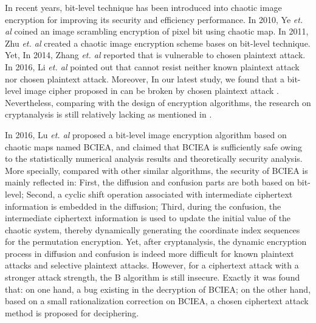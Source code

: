 \documentclass[final,3p,times,twocolumn]{elsarticle}
\begin{document}
In recent years, bit-level technique has been introduced into chaotic image encryption for improving its security and efficiency performance. In 2010, Ye \textit{et. al} \cite{YE2010PRL} coined an image scrambling encryption of pixel bit using chaotic map. In 2011, Zhu \textit{et. al} \cite{zhuzl2011infsci} created a chaotic image encryption scheme bases on bit-level technique. Yet, In 2014, Zhang \textit{et. al} reported that \cite{zhuzl2011infsci} is vulnerable to chosen plaintext attack. In 2016, Li \textit{et. al} pointed out that \cite{YE2010PRL} cannot resist neither known plaintext attack nor chosen plaintext attack. Moreover, In our latest study, we found that a bit-level image cipher proposed in \cite{Shafique2018epjp} can be broken by chosen plaintext attack \cite{wenh2019epjp}. Nevertheless, comparing with the design of encryption algorithms, the research on cryptanalysis is still relatively lacking as mentioned in \cite{wenhp2019entropy}. 


In 2016, Lu \textit{et. al} \cite{LuX2016OLE} proposed a bit-level image encryption algorithm based on chaotic maps named BCIEA, and claimed that BCIEA is sufficiently safe owing to the statistically numerical analysis results and theoretically security analysis. 
More specially, compared with other similar algorithms, the security of BCIEA is mainly reflected in: First, the diffusion and confusion parts are both based on bit-level; Second, a cyclic shift operation associated with intermediate ciphertext information is embedded in the diffusion; Third, during the confusion, the intermediate ciphertext information is used to update the initial value of the chaotic system, thereby dynamically generating the coordinate index sequences for the permutation encryption.
Yet, after cryptanalysis, the dynamic encryption process in diffusion and confusion is indeed more difficult for known plaintext attacks and selective plaintext attacks. However, for a ciphertext attack with a stronger attack strength, the B algorithm is still insecure. Exactly it was found that: on one hand, a bug existing in the decryption of BCIEA; on the other hand, based on a small rationalization correction on BCIEA, a chosen ciphertext attack method is proposed for deciphering. 
\end{document}
